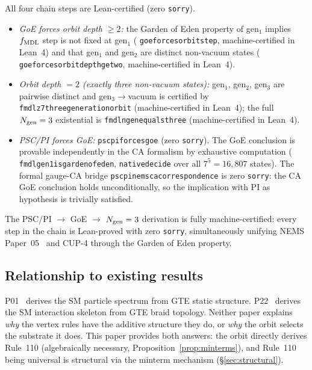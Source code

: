 \documentclass[11pt]{article}
\theoremstyle{remark}
\newcommand{\lean}[1]{%
  \penalty-100
  \begingroup\def\_{\textunderscore\allowbreak}\texttt{#1}\endgroup}
\begin{document}
All four chain steps are Lean-certified (zero \texttt{sorry}).
\begin{itemize}
\item \emph{GoE forces orbit depth $\geq 2$:} the Garden of Eden property of gen$_1$
  implies $f_{\rm MDL}$ step is not fixed at gen$_1$ (\lean{goe\_forces\_orbit\_step},
  machine-certified in Lean~4) and that gen$_1$ and gen$_2$ are distinct non-vacuum states
  (\lean{goe\_forces\_orbit\_depth\_ge\_two}, machine-certified in Lean~4).
\item \emph{Orbit depth $= 2$ (exactly three non-vacuum states):} gen$_1$, gen$_2$,
  gen$_3$ are pairwise distinct and gen$_3\to$vacuum is certified by
  \lean{fmdl\_z7\_three\_generation\_orbit} (machine-certified in Lean~4); the full $N_{\rm gen}=3$
  existential is \lean{fmdl\_ngen\_equals\_three} (machine-certified in Lean~4).
\item \emph{PSC/PI forces GoE:} \lean{psc\_pi\_forces\_goe} (zero
  \texttt{sorry}). The GoE conclusion is provable independently in the CA
  formalism by exhaustive computation (\lean{fmdl\_gen1\_is\_garden\_of\_eden},
  \lean{native\_decide} over all $7^5 = 16{,}807$ states). The formal
  gauge-CA bridge \lean{psc\_pi\_nems\_ca\_correspondence} is zero
  \texttt{sorry}: the CA GoE conclusion holds unconditionally, so the
  implication with PI as hypothesis is trivially satisfied.
\end{itemize}
The PSC/PI $\to$ GoE $\to$ $N_{\rm gen}=3$ derivation is fully machine-certified:
every step in the chain is Lean-proved with zero \texttt{sorry}, simultaneously
unifying NEMS Paper~05~\cite{SpivackUGP2024} and CUP-4 through the Garden of Eden property.

\subsection{Relationship to existing results}

P01~\cite{Spivack2025_FirstPrinciplesSM} derives the SM particle spectrum from GTE static structure. P22~\cite{Spivack2026_UGPDynamics} derives the
SM interaction skeleton from GTE braid topology. Neither paper explains \emph{why}
the vertex rules have the additive structure they do, or \emph{why} the orbit
selects the substrate it does. This paper provides both answers:
the orbit directly derives Rule~110 (algebraically necessary,
Proposition~\ref{prop:minterms}), and Rule~110 being universal is structural via the
minterm mechanism (\S\ref{sec:structural}).
\end{document}
